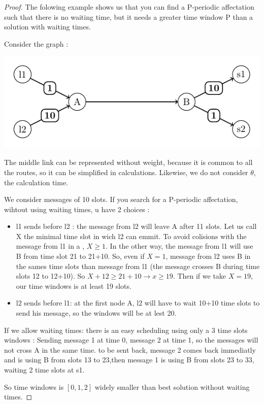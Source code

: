 \documentclass{article}
\begin{document}
\begin{proof}
 
The folowing example shows us that you can find a P-periodic affectation such that there is no waiting time, but it needs a greater time window P than a
solution with waiting times.

Consider the graph : 
\begin{center}
 
\includegraphics[scale=0.7]{Fig10.pdf}
\end{center}

The middle link can be represented without weight, because it is common to all the routes, so it can be simplified in calculations. 
Likewise, we do not consider $\theta$, the calculation time.

We consider messages of 10 slots. If you search for a P-periodic affectation, wihtout using waiting times, u have 2 choices : 
\begin{itemize}
 \item l1 sends before l2 : the message from l2 will leave A after 11 slots. Let us call X the minimal time slot in wich l2 can emmit. 
 To avoid colisions with the message from l1 in a , $X\ge1$.
 In the other way, the message from l1 will use B from time slot 21 to 21+10. So, even if $X = 1$, message from l2 uses B in the sames time slots
 than message from l1 (the message crosses B during time slots 12 to 12+10). So $X+12 \ge 21+10 \rightarrow x\ge 19$. Then if we take $X=19$, our time
 windows is at least 19 slots.
 \item l2 sends before l1: at the first node A, l2 will have to wait 10+10 time slots to send his message, so the windows will be at lest 20.
\end{itemize}

If we allow waiting times: there is an easy scheduling using only a 3 time slots windows : 
Sending message 1 at time 0, message 2 at time 1, so the messages will not cross A in the same time. to be sent back,
message 2 comes back immediatly and is using B from slots 13 to 23,then message 1 is using B from slots 23 to 33, waiting 2 time slots at s1.

So time windows is $[0,1,2]$ widely smaller than best solution without waiting times.

\end{proof}
\end{document}
